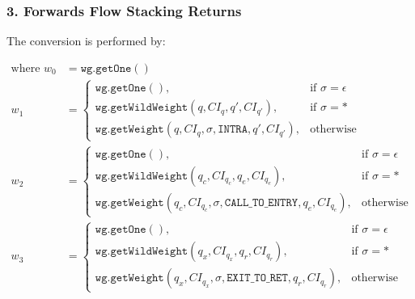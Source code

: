 \subsubsection{3. Forwards Flow Stacking Returns}

\noindent The conversion is performed by:

\begin{changebar}
\begin{align*}
\text{where }
w_0 &= \mathtt{wg.getOne}() \\
w_1 &= \begin{cases}
           \mathtt{wg.getOne}(), & \text{if } \sigma = \epsilon \\
           \mathtt{wg.getWildWeight}(q,CI_q,q',CI_{q'}), & \text{if } \sigma = \text{*} \\
           \mathtt{wg.getWeight}(q,CI_q,\sigma, \mathtt{INTRA},q',CI_{q'}), & \text{otherwise}
       \end{cases} \\
w_2 &= \begin{cases}
           \mathtt{wg.getOne}(), & \text{if } \sigma = \epsilon \\
           \mathtt{wg.getWildWeight}(q_c,CI_{q_c},q_e,CI_{q_e}), & \text{if } \sigma = \text{*} \\
           \mathtt{wg.getWeight}(q_c,CI_{q_c},\sigma, \mathtt{CALL\_TO\_ENTRY},q_e,CI_{q_e}), & \text{otherwise}
      \end{cases} \\
w_3 &= \begin{cases}
          \mathtt{wg.getOne}(), & \text{if } \sigma = \epsilon \\
          \mathtt{wg.getWildWeight}(q_x,CI_{q_x},q_r,CI_{q_r}), & \text{if } \sigma = \text{*} \\
          \mathtt{wg.getWeight}(q_x,CI_{q_x},\sigma, \mathtt{EXIT\_TO\_RET},q_r,CI_{q_r}), & \text{otherwise}
      \end{cases} 
\end{align*}
\end{changebar}

